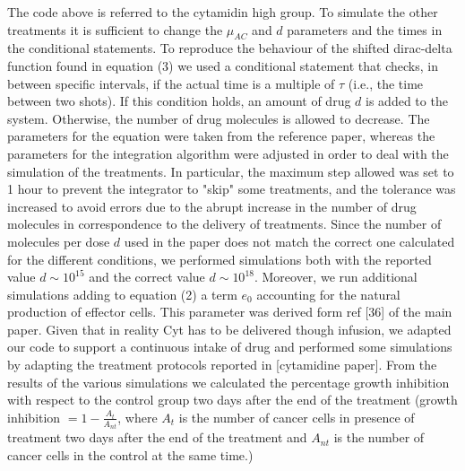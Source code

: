 The code above is referred to the cytamidin high group. To simulate the other treatments it is sufficient to change the $\mu_{AC}$ and $d$ parameters and the times in the conditional statements.
To reproduce the behaviour of the shifted dirac-delta function found in equation (3) we used a conditional statement that checks, in between specific intervals, if the actual time is a multiple of $\tau$ (i.e., the time between two shots). If this condition holds, an amount of drug $d$ is added to the system. Otherwise, the number of drug molecules is allowed to decrease. 
The parameters for the equation were taken from the reference paper, whereas the parameters for the integration algorithm were adjusted in order to deal with the simulation of the treatments. In particular, the maximum step allowed was set to 1 hour to prevent the integrator to "skip" some treatments, and the tolerance was increased to avoid errors due to the abrupt increase in the number of drug molecules in correspondence to the delivery of treatments.
Since the number of molecules per dose $d$ used in the paper does not match the correct one calculated for the different conditions, we performed simulations both with the reported value $d \sim 10^{15}$ and the correct value $d \sim 10^{18}$. Moreover, we run additional simulations adding to equation (2) a term $e_0$ accounting for the natural production of effector cells. This parameter was derived form ref [36] of the main paper.
Given that in reality Cyt has to be delivered though infusion, we adapted our code to support a continuous intake of drug and performed some simulations by adapting the treatment protocols reported in [cytamidine paper].
From the results of the various simulations we calculated the percentage growth inhibition with respect to the control group two days after the end of the treatment (growth inhibition $= 1 - \frac{A_t}{A_{nt}}$, where $A_t$ is the number of cancer cells in presence of treatment two days after the end of the treatment and $A_{nt}$ is the number of cancer cells in the control at the same time.)
